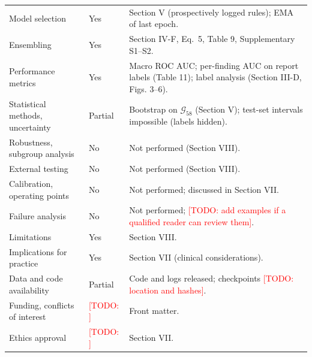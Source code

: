 \documentclass[10pt]{article}
\newcommand{\TODO}[1]{\textcolor{red}{[TODO: #1]}}
\newcommand{\gold}{$\mathcal{G}_{58}$}
\begin{document}
\begin{longtable}{p{4.2cm}p{3.6cm}p{8.2cm}}
Model selection & Yes & Section V (prospectively logged rules); EMA of last epoch.\\
Ensembling & Yes & Section IV-F, Eq.~5, Table 9, Supplementary S1--S2.\\
Performance metrics & Yes & Macro ROC AUC; per-finding AUC on report labels (Table 11); label analysis (Section III-D, Figs. 3--6).\\
Statistical methods, uncertainty & Partial & Bootstrap on \gold{} (Section V); test-set intervals impossible (labels hidden).\\
Robustness, subgroup analysis & No & Not performed (Section VIII).\\
External testing & No & Not performed (Section VIII).\\
Calibration, operating points & No & Not performed; discussed in Section VII.\\
Failure analysis & No & Not performed; \TODO{add examples if a qualified reader can review them}.\\
Limitations & Yes & Section VIII.\\
Implications for practice & Yes & Section VII (clinical considerations).\\
Data and code availability & Partial & Code and logs released; checkpoints \TODO{location and hashes}.\\
Funding, conflicts of interest & \TODO{} & Front matter.\\
Ethics approval & \TODO{} & Section VII.\\
\bottomrule
\end{longtable}
\end{document}
